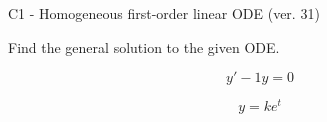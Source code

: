 \begin{exercise}
  \begin{exerciseTitle}C1 - Homogeneous first-order linear ODE (ver. 31)\end{exerciseTitle}
  \begin{exerciseStatement}
    
Find the general solution to the given ODE.

    
\[y'-1y=0\]

  \end{exerciseStatement}
  \begin{exerciseAnswer}
    
\[y= k e^{t}\]

  \end{exerciseAnswer}
\end{exercise}